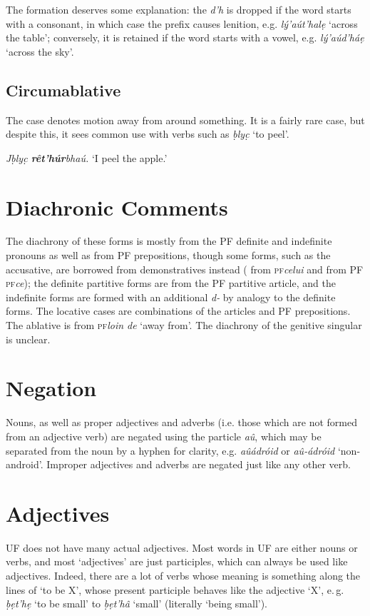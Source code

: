 \documentclass[a4paper, 12pt, twoside, openright, final]{book}
\def\pfabbr{{\normalfont\scshape pf\space}}
\def\pf#1{\pfabbr\textit{#1}}
\def \b {ḅ}
\let \w \textit
\let \b \textbf
\begin{document}
The formation  deserves some explanation: the \w{d’h} is dropped if the word starts with a consonant, in
which case the prefix causes lenition, e.g. \w{lý’aút’halẹ} ‘across the table’; conversely, it is retained if the word
starts with a vowel, e.g. \w{lý’aúd’háẹ} ‘across the sky’.

\subsection{Circumablative}
The  case denotes motion away from around something. It is a fairly rare case, but despite this, it sees common
use with verbs such as \w{ḅlyc̣} ‘to peel’.
\begin{examples}
    \item \w{Jḅlyc̣ \b{rêt’húr}bhaú.} ‘I peel the apple.’
\end{examples}



\section{Diachronic Comments}
The diachrony of these forms is mostly from the PF definite and indefinite pronouns as well as from PF prepositions, though
some forms, such as the
accusative, are borrowed from demonstratives instead ( from \pf{celui} and  from PF \pf{ce}); the definite
partitive forms are from the PF partitive article, and
the indefinite forms are formed with an additional \w{d-} by analogy to the definite forms. The locative cases are combinations
of the articles and PF prepositions. The ablative is from \pf{loin de} ‘away from’. The diachrony of the genitive singular
is unclear.

\section{Negation}\label{subsubsec:noun-negation}
Nouns, as well as proper adjectives and adverbs (i.e. those which are not formed from an adjective verb) are negated
using the particle \w{aû}, which may be separated from the noun by a hyphen for clarity, e.g. \w{aûádróid} or \w{aû-ádróid}
‘non-android’. Improper adjectives and adverbs are negated just like any other verb.

\section{Adjectives}
UF does not have many actual adjectives. Most words in UF are either nouns or verbs, and most ‘adjectives’ are just
participles, which can always be used like adjectives. Indeed, there are a lot of verbs whose meaning is something
along the lines of ‘to be X’, whose present participle behaves like the adjective ‘X’, e.\,g. \w{ḅẹt’hẹ} ‘to be small’
to \w{ḅẹt’hâ} ‘small’ (literally ‘being small’).
\end{document}
